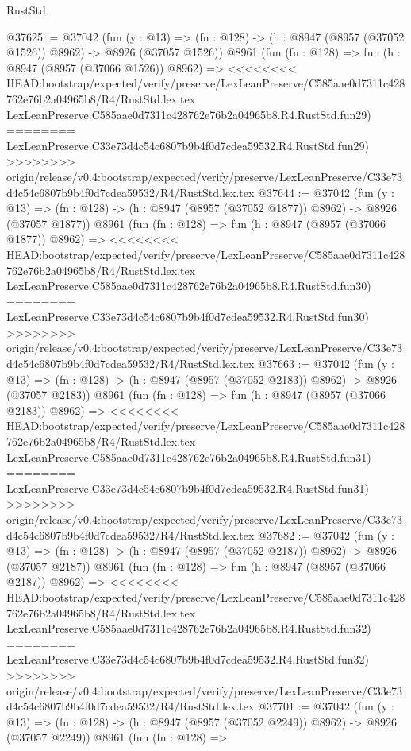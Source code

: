 \begin{lexlean}{RustStd}
\begin{coremodule}
{\begin{coremodule}
{{{{{{{{{{{{{{{{{{{{{{{{{{{{{{{{{{{{{{{@37625 := @37042
    (fun (y : @13) =>
    (fn : @128) -> (h : @8947 (@8957 (@37052 @1526)) @8962) -> @8926 (@37057 @1526))
    @8961
    (fun (fn : @128) =>
    fun (h : @8947 (@8957 (@37066 @1526)) @8962) =>
<<<<<<<< HEAD:bootstrap/expected/verify/preserve/LexLeanPreserve/C585aae0d7311c428762e76b2a04965b8/R4/RustStd.lex.tex
    LexLeanPreserve.C585aae0d7311c428762e76b2a04965b8.R4.RustStd.fun29)
========
    LexLeanPreserve.C33e73d4c54c6807b9b4f0d7cdea59532.R4.RustStd.fun29)
>>>>>>>> origin/release/v0.4:bootstrap/expected/verify/preserve/LexLeanPreserve/C33e73d4c54c6807b9b4f0d7cdea59532/R4/RustStd.lex.tex
@37644 := @37042
    (fun (y : @13) =>
    (fn : @128) -> (h : @8947 (@8957 (@37052 @1877)) @8962) -> @8926 (@37057 @1877))
    @8961
    (fun (fn : @128) =>
    fun (h : @8947 (@8957 (@37066 @1877)) @8962) =>
<<<<<<<< HEAD:bootstrap/expected/verify/preserve/LexLeanPreserve/C585aae0d7311c428762e76b2a04965b8/R4/RustStd.lex.tex
    LexLeanPreserve.C585aae0d7311c428762e76b2a04965b8.R4.RustStd.fun30)
========
    LexLeanPreserve.C33e73d4c54c6807b9b4f0d7cdea59532.R4.RustStd.fun30)
>>>>>>>> origin/release/v0.4:bootstrap/expected/verify/preserve/LexLeanPreserve/C33e73d4c54c6807b9b4f0d7cdea59532/R4/RustStd.lex.tex
@37663 := @37042
    (fun (y : @13) =>
    (fn : @128) -> (h : @8947 (@8957 (@37052 @2183)) @8962) -> @8926 (@37057 @2183))
    @8961
    (fun (fn : @128) =>
    fun (h : @8947 (@8957 (@37066 @2183)) @8962) =>
<<<<<<<< HEAD:bootstrap/expected/verify/preserve/LexLeanPreserve/C585aae0d7311c428762e76b2a04965b8/R4/RustStd.lex.tex
    LexLeanPreserve.C585aae0d7311c428762e76b2a04965b8.R4.RustStd.fun31)
========
    LexLeanPreserve.C33e73d4c54c6807b9b4f0d7cdea59532.R4.RustStd.fun31)
>>>>>>>> origin/release/v0.4:bootstrap/expected/verify/preserve/LexLeanPreserve/C33e73d4c54c6807b9b4f0d7cdea59532/R4/RustStd.lex.tex
@37682 := @37042
    (fun (y : @13) =>
    (fn : @128) -> (h : @8947 (@8957 (@37052 @2187)) @8962) -> @8926 (@37057 @2187))
    @8961
    (fun (fn : @128) =>
    fun (h : @8947 (@8957 (@37066 @2187)) @8962) =>
<<<<<<<< HEAD:bootstrap/expected/verify/preserve/LexLeanPreserve/C585aae0d7311c428762e76b2a04965b8/R4/RustStd.lex.tex
    LexLeanPreserve.C585aae0d7311c428762e76b2a04965b8.R4.RustStd.fun32)
========
    LexLeanPreserve.C33e73d4c54c6807b9b4f0d7cdea59532.R4.RustStd.fun32)
>>>>>>>> origin/release/v0.4:bootstrap/expected/verify/preserve/LexLeanPreserve/C33e73d4c54c6807b9b4f0d7cdea59532/R4/RustStd.lex.tex
@37701 := @37042
    (fun (y : @13) =>
    (fn : @128) -> (h : @8947 (@8957 (@37052 @2249)) @8962) -> @8926 (@37057 @2249))
    @8961
    (fun (fn : @128) =>
}}}}}}}}}}}}}}}}}}}}}}}}}}}}}}}}}}}}}}}
\end{coremodule}}
\end{coremodule}
\end{lexlean}
